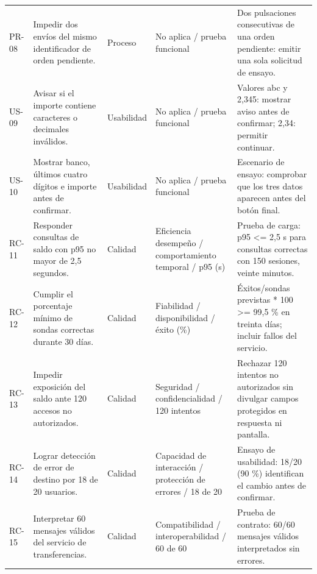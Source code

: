 \documentclass[conference,a4paper]{IEEEtran}
\begin{document}
\begin{table}[!t]
\begin{tabularx}{\textwidth}{@{}p{0.75cm}p{4.0cm}p{1.55cm}p{3.4cm}Y@{}}
PR-08 & Impedir dos envíos del mismo identificador de orden pendiente. & Proceso & No aplica / prueba funcional & Dos pulsaciones consecutivas de una orden pendiente: emitir una sola solicitud de ensayo. \\
US-09 & Avisar si el importe contiene caracteres o decimales inválidos. & Usabilidad & No aplica / prueba funcional & Valores abc y 2,345: mostrar aviso antes de confirmar; 2,34: permitir continuar. \\
US-10 & Mostrar banco, últimos cuatro dígitos e importe antes de confirmar. & Usabilidad & No aplica / prueba funcional & Escenario de ensayo: comprobar que los tres datos aparecen antes del botón final. \\
RC-11 & Responder consultas de saldo con p95 no mayor de 2,5 segundos. & Calidad & Eficiencia desempeño / comportamiento temporal / p95 (s) & Prueba de carga: p95 <= 2,5 s para consultas correctas con 150 sesiones, veinte minutos. \\
RC-12 & Cumplir el porcentaje mínimo de sondas correctas durante 30 días. & Calidad & Fiabilidad / disponibilidad / éxito (\%) & Éxitos/sondas previstas * 100 >= 99,5 \% en treinta días; incluir fallos del servicio. \\
RC-13 & Impedir exposición del saldo ante 120 accesos no autorizados. & Calidad & Seguridad / confidencialidad / 120 intentos & Rechazar 120 intentos no autorizados sin divulgar campos protegidos en respuesta ni pantalla. \\
RC-14 & Lograr detección de error de destino por 18 de 20 usuarios. & Calidad & Capacidad de interacción / protección de errores / 18 de 20 & Ensayo de usabilidad: 18/20 (90 \%) identifican el cambio antes de confirmar. \\
RC-15 & Interpretar 60 mensajes válidos del servicio de transferencias. & Calidad & Compatibilidad / interoperabilidad / 60 de 60 & Prueba de contrato: 60/60 mensajes válidos interpretados sin errores. \\
\bottomrule
\end{tabularx}
\end{table}
\end{document}
